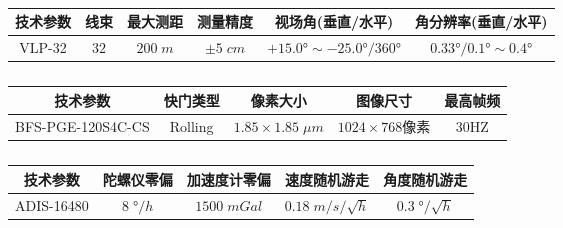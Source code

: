 \begin{table*}[htbp]
  \centering
  \normf
  \begin{tabular}{c|ccccc}
    \hline
    {技术参数} & {线束} & {最大测距} & {测量精度} & {视场角(垂直/水平)}     & {角分辨率(垂直/水平)} \\ \hline
    {VLP-32}   & $32$   & $200\;m$   & $\pm5\;cm$ & $+15.0°\sim-25.0°/360°$ & $0.33°/0.1°\sim0.4°$  \\
    \hline
  \end{tabular}
  \caption{}
  \label{tab:vlp32}
\end{table*}
\begin{table*}[htbp]
  \centering
  \normf
  \begin{tabular}{c|cccc}
    \hline
    {技术参数}             & {快门类型}            & {像素大小} & {图像尺寸} & {最高帧频} \\ \hline
    {BFS-PGE-120S4C-CS}    &
    Rolling                & $
    1.85\times1.85\;\mu m$ & $1024\times768${像素} & 30HZ                                 \\ 	\hline
  \end{tabular}
  \caption{}
  \label{tab:camera}
\end{table*}
\begin{table*}[htbp]
  \centering
  \normf
  \begin{tabular}{c|cccc}
    \hline
    {技术参数}   & {陀螺仪零偏} & {加速度计零偏} & {速度随机游走}       & {角度随机游走}    \\ \hline
    {ADIS-16480} & $8\;°/h$     & $1500\;mGal$   & $0.18\;m/s/\sqrt{h}$ & $0.3\;°/\sqrt{h}$ \\ 	\hline
  \end{tabular}
  \caption{}
  \label{tab:imu}
\end{table*}

